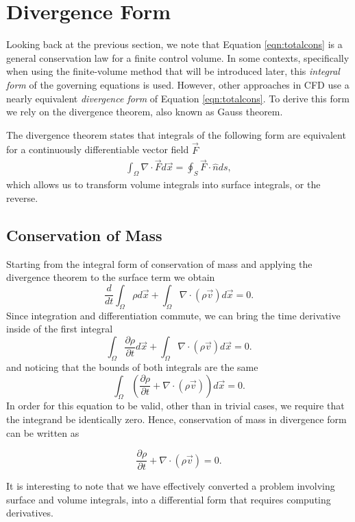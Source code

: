 \section{Divergence Form}
Looking back at the previous section, we note that Equation \ref{eqn:totalcons} is a general conservation law for a finite control volume. In some contexts, specifically when using the finite-volume method that will be introduced later, this {\it integral form} of the governing equations is used. However, other approaches in CFD use a nearly equivalent {\it divergence form} of Equation \ref{eqn:totalcons}. To derive this form we rely on the divergence theorem, also known as Gauss theorem.
\begin{theorem}
The divergence theorem states that integrals of the following form are equivalent for a continuously differentiable vector field $\vec{F}$
\begin{align}
\int_\Omega \nabla \cdot \vec{F} d\vec{x} = \oint_S \vec{F} \cdot \hat{n} ds,
\end{align}
which allows us to transform volume integrals into surface integrals, or the reverse.
\end{theorem}

\subsection{Conservation of Mass}
Starting from the integral form of conservation of mass and applying the divergence theorem to the surface term we obtain
\begin{equation}
	\frac{d}{dt}\int_\Omega \rho d\vec{x} + \int_\Omega \nabla \cdot (\rho \vec{v}) d\vec{x} = 0.
\end{equation}
Since integration and differentiation commute, we can bring the time derivative inside of the first integral
\begin{equation}
	\int_\Omega \frac{\partial \rho}{\partial t} d\vec{x} + \int_\Omega \nabla \cdot (\rho \vec{v}) d\vec{x} = 0.
\end{equation}
and noticing that the bounds of both integrals are the same
\begin{equation}
	\int_\Omega \left( \frac{\partial \rho}{\partial t} + \nabla \cdot (\rho \vec{v}) \right) d\vec{x} = 0.
\end{equation}
In order for this equation to be valid, other than in trivial cases, we require that the integrand be identically zero. Hence, conservation of mass in divergence form can be written as
\begin{eqBox}
\begin{equation}
	\frac{\partial \rho}{\partial t} + \nabla \cdot (\rho \vec{v}) = 0.
\end{equation}
\end{eqBox}
It is interesting to note that we have effectively converted a problem involving surface and volume integrals, into a differential form that requires computing derivatives.

